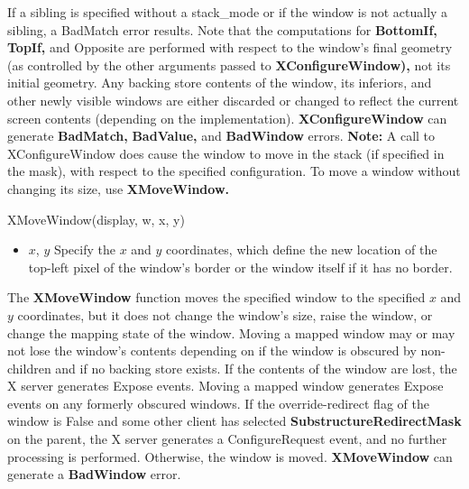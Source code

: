 \documentclass{report}
\begin{document}
\begin{itemize}
            \bigbreak \noindent 
            If a sibling is specified without a stack\_mode or if the window is not actually a sibling, a BadMatch error results. Note that the computations for \textbf{BottomIf,} \textbf{TopIf,} and Opposite are performed with respect to the window’s final geometry (as controlled by the other arguments passed to \textbf{XConfigureWindow),} not its initial geometry. Any backing store contents of the window, its inferiors, and other newly visible windows are either discarded or changed to reflect the current screen contents (depending on the implementation).
            \bigbreak \noindent 
            \textbf{XConfigureWindow} can generate \textbf{BadMatch,} \textbf{BadValue,} and \textbf{BadWindow} errors.
            \bigbreak \noindent 
            \textbf{Note:} A call to XConfigureWindow does cause the window to move in the stack (if specified in the mask), with respect to the specified configuration.
            \bigbreak \noindent 
            To move a window without changing its size, use \textbf{XMoveWindow.}
            \bigbreak \noindent 
            \begin{cppcode}
                XMoveWindow(display, w, x, y)
            \end{cppcode}
            \begin{itemize}
                \item $x$, $y$ Specify the $x$ and $y$ coordinates, which define the new location of the top-left pixel of the window’s border or the window itself if it has no border.
            \end{itemize}
            The \textbf{XMoveWindow} function moves the specified window to the specified $x$ and $y$ coordinates, but it does not change the window’s size, raise the window, or change the mapping state of the window. Moving a mapped window may or may not lose the window’s contents depending on if the window is obscured by non-children and if no backing store exists. If the contents of the window are lost, the X server generates Expose events. Moving a mapped window generates Expose events on any formerly obscured windows.
            \bigbreak \noindent 
            If the override-redirect flag of the window is False and some other client has selected \textbf{SubstructureRedirectMask} on the parent, the X server generates a ConfigureRequest event, and no further processing is performed. Otherwise, the window is moved.
            \bigbreak \noindent 
            \textbf{XMoveWindow} can generate a \textbf{BadWindow} error.
            \bigbreak \noindent 

\end{itemize}
\end{document}
